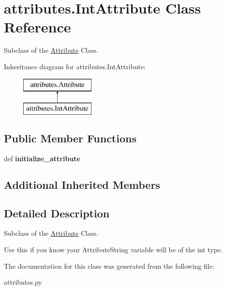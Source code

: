 \hypertarget{classattributes_1_1_int_attribute}{\section{attributes.\-Int\-Attribute Class Reference}
\label{classattributes_1_1_int_attribute}
}


Subclass of the \hyperlink{classattributes_1_1_attribute}{Attribute} Class.  


Inheritance diagram for attributes.\-Int\-Attribute\-:\begin{figure}[H]
\begin{center}
\leavevmode
\includegraphics[height=2.000000cm]{classattributes_1_1_int_attribute}
\end{center}
\end{figure}
\subsection*{Public Member Functions}
\begin{DoxyCompactItemize}
\item 
\hypertarget{classattributes_1_1_int_attribute_a64a12f4797af23caaa241e857b567076}{def {\bfseries initialize\-\_\-attribute}}\label{classattributes_1_1_int_attribute_a64a12f4797af23caaa241e857b567076}

\end{DoxyCompactItemize}
\subsection*{Additional Inherited Members}


\subsection{Detailed Description}
Subclass of the \hyperlink{classattributes_1_1_attribute}{Attribute} Class. 

Use this if you know your Attribute\-String variable will be of the int type. 

The documentation for this class was generated from the following file\-:\begin{DoxyCompactItemize}
\item 
attributes.\-py\end{DoxyCompactItemize}
